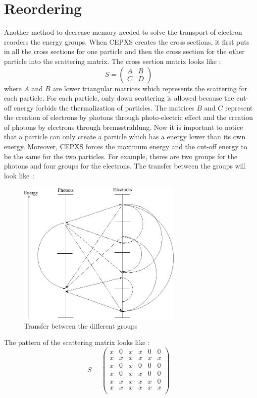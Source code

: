 \section{Reordering}
Another method to decrease memory needed to solve the transport of
electron reorders the energy groups. When CEPXS creates the cross sections,
it first puts in all the cross sections for one particle and then the cross
section for the other particle into the scattering matrix. The cross section 
matrix looks like :
\begin{equation}
S = 
\begin{pmatrix}
A & B\\
C & D
\end{pmatrix}
\end{equation}
where $A$ and $B$ are lower triangular matrices which represents the
scattering for each particle. For each particle, only down scattering
is allowed because the cut-off energy forbids the thermalization of 
particles. The matrices $B$ and $C$ represent the creation of electrons by
photons through photo-electric effect and the creation of photons by
electrons through bremsstrahlung. Now it is important to notice that a
particle can only create a particle which has a energy lower than its own
energy. Moreover, CEPXS forces the maximum energy and the cut-off energy to
be the same for the two particles. For example, theres are two groups for the
photons and four groups for the electrons. The transfer between the groups will 
look \hbox{like :}
\begin{figure}[H]
\begin{center}
\includegraphics[height=7cm]{group.png}
\caption{Transfer between the different groups}
\end{center}
\end{figure}
The pattern of the scattering matrix looks like :
\begin{equation}
S =
\begin{pmatrix}
x & 0 & x & x & 0 & 0\\
x & x & x & x & x & x\\
x & 0 & x & 0 & 0 & 0\\
x & 0 & x & x & 0 & 0\\
x & x & x & x & x & 0\\
x & x & x & x & x & x\\
\end{pmatrix}
\end{equation}
